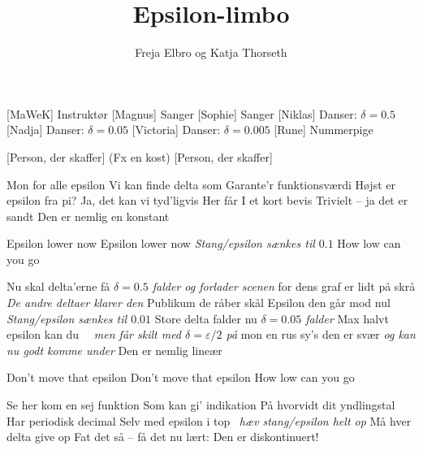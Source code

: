 \documentclass[a4paper,11pt]{article}
\title{Epsilon-limbo}
\author{Freja Elbro og Katja Thorseth}
\begin{document}
\maketitle

\begin{roles}
[MaWeK] Instruktør
[Magnus] Sanger
[Sophie] Sanger
[Niklas] Danser: $\delta = 0.5$
[Nadja] Danser: $\delta = 0.05$
[Victoria] Danser: $\delta = 0.005$
[Rune] Nummerpige
\end{roles}

\begin{props}
[Person, der skaffer] (Fx en kost)
[Person, der skaffer]
\end{props}


\begin{song}


%
Mon for alle epsilon
Vi kan finde delta som
Garante’r funktionsværdi
Højst er epsilon fra pi?
Ja, det kan vi tyd'ligvis
Her får I et kort bevis
Trivielt -- ja det er sandt
Den er nemlig en konstant


%
Epsilon lower now
Epsilon lower now \quad\quad\quad\quad\quad \emph{Stang/epsilon sænkes til $0.1$}
How low can you go

%
Nu skal delta’erne få \quad\quad\quad\quad \emph{$\delta = 0.5$ falder og forlader scenen}
for dens graf er lidt på skrå \quad \emph{De andre deltaer klarer den}
Publikum de råber skål
Epsilon den går mod nul \quad\quad \emph{Stang/epsilon sænkes til $0.01$}
Store delta falder nu \quad\quad\quad\quad \emph{$\delta = 0.05$ falder}
Max halvt epsilon kan du \quad\ \ \emph{men får skilt med $\delta = \varepsilon / 2$ på}
mon en rus sy’s den er svær \quad \emph{og kan nu godt komme under}
Den er nemlig lineær

%
Don’t move that epsilon
Don’t move that epsilon
How low can you go

%
Se her kom en sej funktion
Som kan gi’ indikation
På hvorvidt dit yndlingstal
Har periodisk decimal
Selv med epsilon i top \quad\quad\quad\ \emph{hæv stang/epsilon helt op}
Må hver delta give op
Fat det så – få det nu lært:
Den er diskontinuert!

\end{song}
\end{document}
